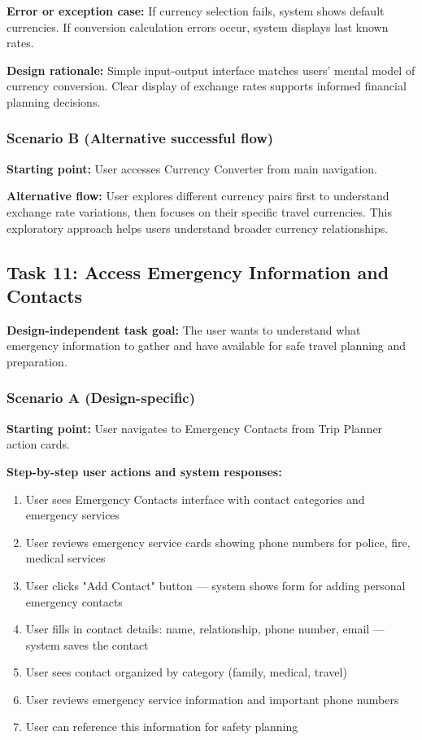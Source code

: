 \documentclass[11pt,a4paper]{article}
\begin{document}
\textbf{Error or exception case:} If currency selection fails, system shows default currencies. If conversion calculation errors occur, system displays last known rates.

\textbf{Design rationale:} Simple input-output interface matches users' mental model of currency conversion. Clear display of exchange rates supports informed financial planning decisions.

\subsubsection*{Scenario B (Alternative successful flow)}

\textbf{Starting point:} User accesses Currency Converter from main navigation.

\textbf{Alternative flow:} User explores different currency pairs first to understand exchange rate variations, then focuses on their specific travel currencies. This exploratory approach helps users understand broader currency relationships.

\subsection*{Task 11: Access Emergency Information and Contacts}

\textbf{Design-independent task goal:}
The user wants to understand what emergency information to gather and have available for safe travel planning and preparation.

\subsubsection*{Scenario A (Design-specific)}

\textbf{Starting point:} User navigates to Emergency Contacts from Trip Planner action cards.

\textbf{Step-by-step user actions and system responses:}
\begin{enumerate}
\item User sees Emergency Contacts interface with contact categories and emergency services
\item User reviews emergency service cards showing phone numbers for police, fire, medical services
\item User clicks "Add Contact" button — system shows form for adding personal emergency contacts
\item User fills in contact details: name, relationship, phone number, email — system saves the contact
\item User sees contact organized by category (family, medical, travel)
\item User reviews emergency service information and important phone numbers
\item User can reference this information for safety planning
\end{enumerate}
\end{document}
